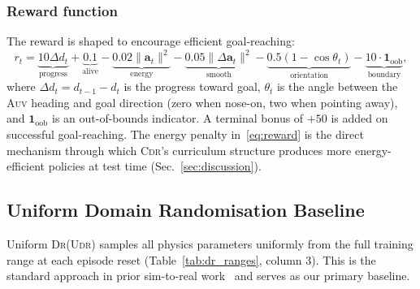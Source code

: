 \documentclass[letterpaper,10pt,journal]{IEEEtran}
\newcommand{\CDR}{\textsc{Cdr}\xspace}
\newcommand{\UDR}{\textsc{Udr}\xspace}
\newcommand{\AUV}{\textsc{Auv}\xspace}
\newcommand{\DR}{\textsc{Dr}\xspace}
\begin{document}
\subsubsection*{Reward function}
The reward is shaped to encourage efficient goal-reaching:
\begin{equation}
  r_t = \underbrace{10\Delta d_t}_\text{progress}
      + \underbrace{0.1}_\text{alive}
      - \underbrace{0.02\|\mathbf{a}_t\|^2}_\text{energy}
      - \underbrace{0.05\|\Delta\mathbf{a}_t\|^2}_\text{smooth}
      - \underbrace{0.5(1-\cos\theta_t)}_\text{orientation}
      - \underbrace{10\cdot\mathbf{1}_\mathrm{oob}}_\text{boundary},
  \label{eq:reward}
\end{equation}
where $\Delta d_t=d_{t-1}-d_t$ is the progress toward goal, $\theta_t$
is the angle between the \AUV heading and goal direction (zero when
nose-on, two when pointing away), and $\mathbf{1}_\mathrm{oob}$ is
an out-of-bounds indicator.
A terminal bonus of $+50$ is added on successful goal-reaching.
The energy penalty in~\eqref{eq:reward} is the direct mechanism
through which \CDR's curriculum structure produces more energy-efficient
policies at test time (Sec.~\ref{sec:discussion}).

\subsection{Uniform Domain Randomisation Baseline}
\label{sec:udr}

Uniform \DR (\UDR) samples all physics parameters uniformly from the
full training range at each episode reset (Table~\ref{tab:dr_ranges},
column 3).
This is the standard approach in prior sim-to-real
work~\cite{tobin2017,peng2018,arndt2024} and serves as our primary
baseline.
\end{document}
